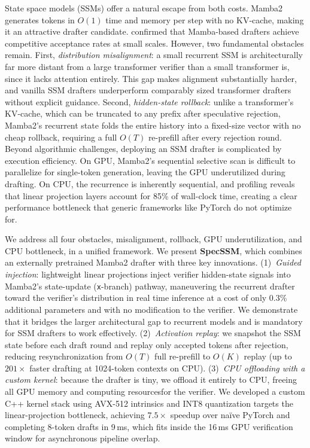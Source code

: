 State space models (SSMs) offer a natural escape from both costs.
Mamba2~\citep{dao2024transformers} generates tokens in $O(1)$ time and memory per step with no KV-cache, making it an attractive drafter candidate.
\citet{choi2025mamba} confirmed that Mamba-based drafters achieve competitive acceptance rates at small scales.
However, two fundamental obstacles remain.
First, \emph{distribution misalignment}: a small recurrent SSM is architecturally far more distant from a large transformer verifier than a small transformer is, since it lacks attention entirely.
This gap makes alignment substantially harder, and vanilla SSM drafters underperform comparably sized transformer drafters without explicit guidance.
Second, \emph{hidden-state rollback}: unlike a transformer's KV-cache, which can be truncated to any prefix after speculative rejection, Mamba2's recurrent state folds the entire history into a fixed-size vector with no cheap rollback, requiring a full $O(T)$ re-prefill after every rejection round.
Beyond algorithmic challenges, deploying an SSM drafter is complicated by execution efficiency.
On GPU, Mamba2's sequential selective scan is difficult to parallelize for single-token generation, leaving the GPU underutilized during drafting.
On CPU, the recurrence is inherently sequential, and profiling reveals that linear projection layers account for 85\% of wall-clock time, creating a clear performance bottleneck that generic frameworks like PyTorch do not optimize for.

We address all four obstacles, misalignment, rollback, GPU underutilization, and CPU bottleneck, in a unified framework.
We present \textbf{SpecSSM}, which combines an externally pretrained Mamba2 drafter with three key innovations.
(1)~\emph{Guided injection}: lightweight linear projections inject verifier hidden-state signals into Mamba2's state-update (\texttt{x}-branch) pathway, maneuvering the recurrent drafter toward the verifier's distribution in real time inference at a cost of only 0.3\% additional parameters and with no modification to the verifier. We demonstrate that it bridges the larger architectural gap to recurrent models and is mandatory for SSM drafters to work effectively.
(2)~\emph{Activation replay}: we snapshot the SSM state before each draft round and replay only accepted tokens after rejection, reducing resynchronization from $O(T)$ full re-prefill to $O(K)$ replay (up to $201\times$ faster drafting at 1024-token contexts on CPU).
(3)~\emph{CPU offloading with a custom kernel}: because the drafter is tiny, we offload it entirely to CPU, freeing all GPU memory and computing resourcesfor the verifier.
We developed a custom C++ kernel stack using AVX-512 intrinsics and INT8 quantization targets the linear-projection bottleneck, achieving $7.5\times$ speedup over na\"ive PyTorch and completing 8-token drafts in 9\,ms, which fits inside the 16\,ms GPU verification window for asynchronous pipeline overlap.

